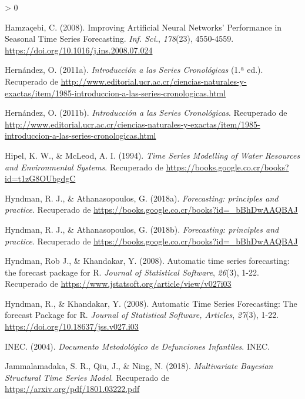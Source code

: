 \documentclass[
]{article}
\newlength{\cslhangindent}
\newenvironment{CSLReferences}[2] %
 {%
  \setlength{\parindent}{0pt}
  \ifodd #1 \everypar{\setlength{\hangindent}{\cslhangindent}}\ignorespaces\fi
  \ifnum #2 > 0
  \setlength{\parskip}{#2\baselineskip}
  \fi
 }%
 {}
\begin{document}
\begin{CSLReferences}{1}{0}
\leavevmode\hypertarget{ref-Hamzacebi}{}%
Hamzaçebi, C. (2008). Improving Artificial Neural Networks' Performance
in Seasonal Time Series Forecasting. \emph{Inf. Sci.}, \emph{178}(23),
4550-4559. \url{https://doi.org/10.1016/j.ins.2008.07.024}

\leavevmode\hypertarget{ref-oscarh-1}{}%
Hernández, O. (2011a). \emph{Introducción a las Series Cronológicas}
(1.ª ed.). Recuperado de
\url{http://www.editorial.ucr.ac.cr/ciencias-naturales-y-exactas/item/1985-introduccion-a-las-series-cronologicas.html}

\leavevmode\hypertarget{ref-oscarh-4}{}%
Hernández, O. (2011b). \emph{Introducción a las Series Cronológicas}.
Recuperado de
\url{http://www.editorial.ucr.ac.cr/ciencias-naturales-y-exactas/item/1985-introduccion-a-las-series-cronologicas.html}

\leavevmode\hypertarget{ref-Hipel}{}%
Hipel, K. W., \& McLeod, A. I. (1994). \emph{Time Series Modelling of
Water Resources and Environmental Systems}. Recuperado de
\url{https://books.google.co.cr/books?id=t1zG8OUbgdgC}

\leavevmode\hypertarget{ref-hyndman2018forecasting}{}%
Hyndman, R. J., \& Athanasopoulos, G. (2018a). \emph{Forecasting:
principles and practice}. Recuperado de
\url{https://books.google.co.cr/books?id=_bBhDwAAQBAJ}

\leavevmode\hypertarget{ref-hyndman_box-jenkins}{}%
Hyndman, R. J., \& Athanasopoulos, G. (2018b). \emph{Forecasting:
principles and practice}. Recuperado de
\url{https://books.google.co.cr/books?id=_bBhDwAAQBAJ}

\leavevmode\hypertarget{ref-forecast}{}%
Hyndman, Rob J., \& Khandakar, Y. (2008). Automatic time series
forecasting: the forecast package for {R}. \emph{Journal of Statistical
Software}, \emph{26}(3), 1-22. Recuperado de
\url{https://www.jstatsoft.org/article/view/v027i03}

\leavevmode\hypertarget{ref-auto.arima}{}%
Hyndman, R., \& Khandakar, Y. (2008). Automatic Time Series Forecasting:
The forecast Package for R. \emph{Journal of Statistical Software,
Articles}, \emph{27}(3), 1-22.
\url{https://doi.org/10.18637/jss.v027.i03}

\leavevmode\hypertarget{ref-infantiles}{}%
INEC. (2004). \emph{Documento Metodológico de Defunciones Infantiles}.
INEC.

\leavevmode\hypertarget{ref-bayes}{}%
Jammalamadaka, S. R., Qiu, J., \& Ning, N. (2018). \emph{Multivariate
Bayesian Structural Time Series Model}. Recuperado de
\url{https://arxiv.org/pdf/1801.03222.pdf}


\end{CSLReferences}
\end{document}
